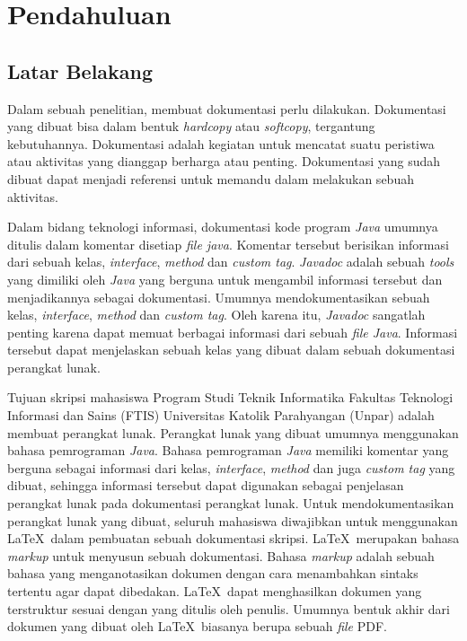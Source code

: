 \chapter{Pendahuluan}
\label{chap:intro}
   
\section{Latar Belakang}
\label{sec:label}

Dalam sebuah penelitian, membuat dokumentasi perlu dilakukan. Dokumentasi yang dibuat bisa dalam bentuk {\it hardcopy} atau {\it softcopy}, tergantung kebutuhannya. Dokumentasi adalah kegiatan untuk mencatat suatu peristiwa atau aktivitas yang dianggap berharga atau penting. Dokumentasi yang sudah dibuat dapat menjadi referensi untuk memandu dalam melakukan sebuah aktivitas.

Dalam bidang teknologi informasi, dokumentasi kode program {\it Java} umumnya ditulis dalam komentar disetiap {\it file java}. Komentar tersebut berisikan informasi dari sebuah kelas, {\it interface}, {\it method} dan {\it custom tag}. {\it Javadoc} adalah sebuah {\it tools} yang dimiliki oleh {\it Java} yang berguna untuk mengambil informasi tersebut dan menjadikannya sebagai dokumentasi. Umumnya mendokumentasikan sebuah kelas, {\it interface}, {\it method} dan {\it custom tag}. Oleh karena itu, {\it Javadoc} sangatlah penting karena dapat memuat berbagai informasi dari sebuah {\it file Java}. Informasi tersebut dapat menjelaskan sebuah kelas yang dibuat dalam sebuah dokumentasi perangkat lunak. 

Tujuan skripsi mahasiswa Program Studi Teknik Informatika Fakultas Teknologi Informasi dan Sains (FTIS) Universitas Katolik Parahyangan (Unpar) adalah membuat perangkat lunak. Perangkat lunak yang dibuat umumnya menggunakan bahasa pemrograman {\it Java}. Bahasa pemrograman {\it Java} memiliki komentar yang berguna sebagai informasi dari kelas, {\it interface}, {\it method} dan juga {\it custom tag} yang dibuat, sehingga informasi tersebut dapat digunakan sebagai penjelasan perangkat lunak pada dokumentasi perangkat lunak. Untuk mendokumentasikan perangkat lunak yang dibuat, seluruh mahasiswa diwajibkan untuk menggunakan \LaTeX\ dalam pembuatan sebuah dokumentasi skripsi. \LaTeX\ merupakan bahasa {\it markup} untuk menyusun sebuah dokumentasi. Bahasa {\it markup} adalah sebuah bahasa yang menganotasikan dokumen dengan cara menambahkan sintaks tertentu agar dapat dibedakan. \LaTeX\ dapat menghasilkan dokumen yang terstruktur sesuai dengan yang ditulis oleh penulis. Umumnya bentuk akhir dari dokumen yang dibuat oleh \LaTeX\ biasanya berupa sebuah {\it file} PDF.

